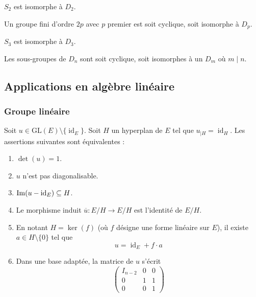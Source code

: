 
  \begin{example}
    $S_2$ est isomorphe à $D_2$.
  \end{example}


  \begin{proposition}
    Un groupe fini d'ordre $2p$ avec $p$ premier est soit cyclique, soit isomorphe à $D_p$.
  \end{proposition}

  \begin{example}
    $S_3$ est isomorphe à $D_3$.
  \end{example}


  \begin{proposition}
    Les sous-groupes de $D_n$ sont soit cyclique, soit isomorphes à un $D_m$ où $m \mid n$.
  \end{proposition}

  \subsection{Applications en algèbre linéaire}

  \subsubsection{Groupe linéaire}


  \begin{proposition}
    Soit $u \in \mathrm{GL}(E) \setminus \{ \operatorname{id}_E \}$. Soit $H$ un hyperplan de $E$ tel que $u_{|H} = \operatorname{id}_H$. Les assertions suivantes sont équivalentes :
    \begin{enumerate}[label={\bfseries(\roman*)}]
      \item $\det(u) = 1$.
      \item $u$ n'est pas diagonalisable.
      \item $\mathrm{Im}(u - \operatorname{id}_E) \subseteq H$.
      \item Le morphisme induit $\overline{u} : E/H \rightarrow E/H$ est l'identité de $E/H$.
      \item En notant $H = \ker(f)$ (où $f$ désigne une forme linéaire sur $E$), il existe $a \in H \setminus \{ 0 \}$ tel que
      \[ u = \operatorname{id}_E + f \cdot a \]
      \item Dans une base adaptée, la matrice de $u$ s'écrit
      \[
      \begin{pmatrix}
        I_{n-2} & 0 & 0 \\
        0 & 1 & 1 \\
        0 & 0 & 1
      \end{pmatrix}
      \]
    \end{enumerate}
  \end{proposition}

